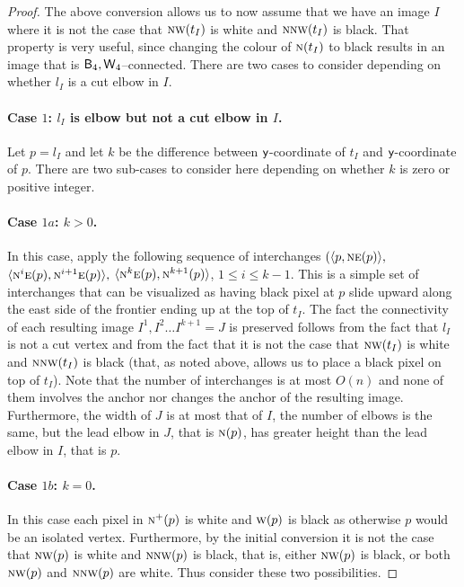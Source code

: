 \documentclass[lotsofwhite,charterfonts]{patmorin}
\newcommand{\fourfour}{\ensuremath{\protect\textup{\textsf{B}}_{4},\protect\textup{\textsf{W}}_{4}}}
\newcommand{\N}{\textsc{n}}
\newcommand{\NE}{\textsc{ne}}
\newcommand{\E}{\textsc{e}}
\newcommand{\W}{\textsc{w}}
\newcommand{\NW}{\textsc{nw}}
\newcommand{\y}{\ensuremath{\protect\textup{\textsf{y}}}}
\newcommand{\ic}[2]{\langle #1,#2 \rangle}
\begin{document}
\begin{proof}
The above conversion allows us to now assume that we have an image $I$
where it is not the case that $\NW(t_{I})$ is white and $\N\NW(t_{I})$
is black. That property is very useful, since changing the colour of
$\N(t_I)$ to black results in an image that is $\fourfour$--connected.
There are two cases to consider depending on whether $l_I$ is a cut
elbow in $I$. 

\paragraph{Case $1$: $l_I$ is elbow but not a cut elbow in $I$.} 

Let $p=l_I$ and let $k$ be the difference between \y-coordinate of
$t_I$ and \y-coordinate of $p$. There are two sub-cases to consider
here depending on whether $k$ is zero or positive integer. 

\paragraph{Case $1a$: $k>0$.} In this case, apply the following
sequence of interchanges $(\ic{p}{\NE(p)},$
$\ic{\N^i\E(p)}{\N^{i+1}\E(p)},$ $\ic{\N^k\E(p)}{\N^{k+1}(p)}$, $1
\leq i \leq k-1$. This is a simple set of interchanges that can be
visualized as having black pixel at $p$ slide upward along the east
side of the frontier ending up at the top of $t_I$. The fact the
connectivity of each resulting image $I^1, I^2\dots I^{k+1}=J$ is
preserved follows from the fact that $l_I$ is not a cut vertex and
from the fact that it is not the case that  $\NW(t_{I})$ is white and
$\N\NW(t_{I})$ is black (that, as noted above, allows us to place a
black pixel on top of $t_I$). Note that the number of interchanges is
at most $O(n)$ and none of them involves the anchor nor changes the
anchor of the resulting image. Furthermore, the width of $J$ is at
most that of $I$, the number of elbows is the same, but the lead elbow
in $J$, that is $\N(p)$, has greater height than the lead elbow in
$I$, that is $p$.   

\paragraph{Case $1b$: $k=0$.} In this case each pixel in $\N^+(p)$ is
white and $\W(p)$ is black as otherwise $p$ would be an isolated
vertex. Furthermore, by the initial conversion it is not the case that
$\NW(p)$ is white and $\N\NW(p)$ is black, that is, either $\NW(p)$ is
black, or both $\NW(p)$ and $\N\NW(p)$ are white. Thus consider these
two possibilities.


\end{proof}
\end{document}
